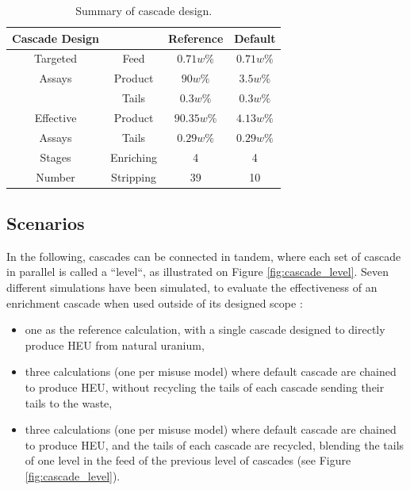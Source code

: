 \begin{table}[htb]
\centering
  \caption{Summary of cascade design.}
\begin{tabular}{cccc}
\toprule

Cascade Design &       & Reference   & Default    \\
\midrule
Targeted  & Feed       & $0.71w\%$   & $0.71w\%$  \\
Assays    & Product    & $90w\%$     & $3.5w\%$   \\
          & Tails      & $0.3w\%$   & $0.3w\%$   \\
\midrule
Effective & Product    & $90.35w\%$  & $4.13w\%$  \\
Assays    & Tails      & $0.29w\%$   & $0.29w\%$  \\ 
\midrule
Stages    & Enriching  & 4          & 4          \\
Number    & Stripping  & 39         & 10         \\
\bottomrule
\end{tabular}
  \label{tab:cascade_config}
\end{table}


\subsection{Scenarios}
In the following, cascades can be connected in tandem, where each set of cascade
in parallel is called a ``level``, as illustrated on Figure
\ref{fig:cascade_level}.
Seven different simulations have been simulated, to evaluate the effectiveness
of an enrichment cascade when used outside of its designed scope :
\begin{itemize}
\item one as the reference calculation, with a single cascade designed to
    directly produce \gls{HEU} from natural uranium,
\item three calculations (one per misuse model) where default cascade are
    chained to produce \gls{HEU}, without recycling the tails of each cascade
    sending their tails to the waste,
\item three calculations (one per misuse model) where default cascade are
    chained to produce \gls{HEU}, and the tails of each cascade are recycled, blending
    the tails of one level in the feed of the previous level of
    cascades (see Figure \ref{fig:cascade_level}).
\end{itemize}

